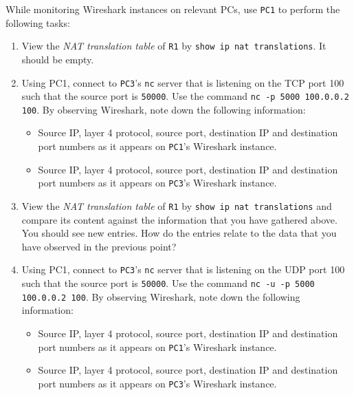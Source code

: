 \documentclass[pdftex,12pt,a4paper]{article}
\begin{document}
                While monitoring Wireshark instances on relevant PCs, use
                \texttt{PC1} to perform the following tasks:
                \begin{enumerate}
                    \item View the \emph{NAT translation table} of \texttt{R1}
                        by \texttt{show ip nat translations}. It should be
                        empty.

                    \item Using PC1, connect to \texttt{PC3}'s \texttt{nc} server that is
                        listening on the TCP port 100 such that the source port is
                        \texttt{50000}. Use the command \texttt{nc -p 5000
                        100.0.0.2 100}. By observing Wireshark, note down the following
                        information:
                        \begin{itemize}
                            \item Source IP, layer 4 protocol, source port, destination IP and
                                destination port numbers as it appears on
                                \texttt{PC1}'s Wireshark instance.
                            \item Source IP, layer 4 protocol, source port, destination IP and
                                destination port numbers as it appears on
                                \texttt{PC3}'s Wireshark instance.
                        \end{itemize}

                    \item View the \emph{NAT translation table} of \texttt{R1}
                        by \texttt{show ip nat translations} and compare its
                        content against the information that you have gathered
                        above. You should see new entries. How do the entries
                        relate to the data that you have observed in the
                        previous point?

                    \item Using PC1, connect to \texttt{PC3}'s \texttt{nc} server that is
                        listening on the UDP port 100 such that the source port is
                        \texttt{50000}. Use the command \texttt{nc -u -p 5000
                        100.0.0.2 100}. By observing Wireshark, note down the following
                        information:
                        \begin{itemize}
                            \item Source IP, layer 4 protocol, source port, destination IP and
                                destination port numbers as it appears on
                                \texttt{PC1}'s Wireshark instance.
                            \item Source IP, layer 4 protocol, source port, destination IP and
                                destination port numbers as it appears on
                                \texttt{PC3}'s Wireshark instance.
                        \end{itemize}


\end{enumerate}
\end{document}
